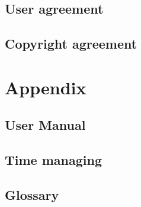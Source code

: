\documentclass[a4paper,12pt]{scrreprt}
\begin{document}
\chapter*{User agreement}
\chapter*{Copyright agreement}
\part{Appendix}
\chapter*{User Manual}
\chapter*{Time managing}
\chapter*{Glossary}

\thispagestyle{fancy}
\end{document}
